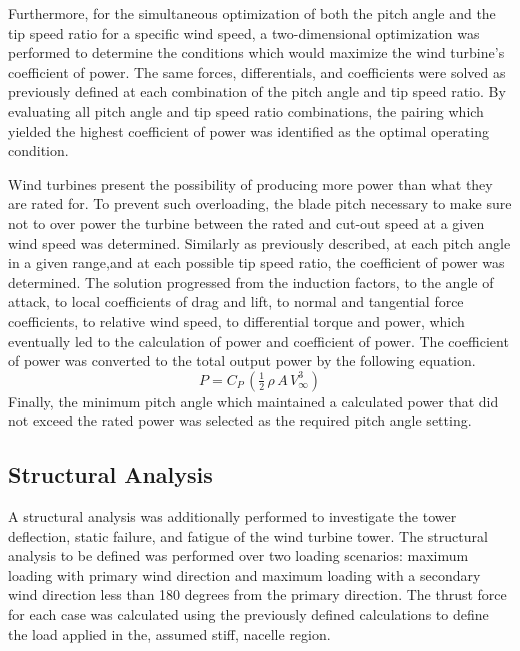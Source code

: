 \documentclass[11pt]{article}
\begin{document}
Furthermore, for the simultaneous optimization of both the pitch angle and the tip speed ratio for a specific wind speed, a  two-dimensional optimization was performed to determine the conditions which would maximize the wind turbine’s coefficient of power. The same forces, differentials, and coefficients were solved as previously defined at each combination of the pitch angle and tip speed ratio. By evaluating all pitch angle and tip speed ratio combinations, the pairing which yielded the highest coefficient of power was identified as the optimal operating condition.

Wind turbines present the possibility of producing more power than what they are rated for. To prevent such overloading, the blade pitch necessary to make sure not to over power the turbine between the rated and cut-out speed at a given wind speed was determined. Similarly as previously described, at each pitch angle in a given range,and at each possible tip speed ratio, the coefficient of power was determined. The solution progressed from the induction factors, to the angle of attack, to local coefficients of drag and lift, to normal and tangential force coefficients, to relative wind speed, to differential torque and power, which eventually led to the calculation of power and coefficient of power. The coefficient of power was converted to the total output power by the following equation.
\begin{equation}
P = C_P\,\left(\tfrac{1}{2}\,\rho\,A\,V_\infty^{3}\right)
\label{eq:P_from_CP}
\end{equation}
Finally, the minimum pitch angle which maintained a calculated power that did not exceed the rated power was selected as the required pitch angle setting.

\subsection{Structural Analysis}

A structural analysis was additionally performed to investigate the tower deflection, static failure, and fatigue of the wind turbine tower. The structural analysis to be defined was performed over two loading scenarios: maximum loading with primary wind direction and maximum loading with a secondary wind direction less than 180 degrees from the primary direction. The thrust force for each case was calculated using the previously defined calculations to define the load applied in the, assumed stiff,  nacelle region.
\end{document}
